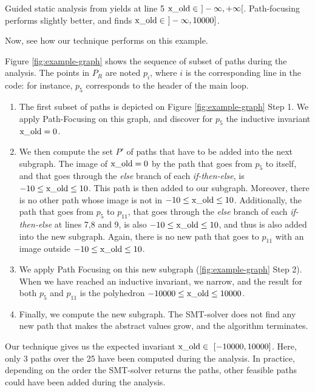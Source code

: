 \documentclass[preprint]{sigplanconf}
\begin{document}
Guided static analysis from \citet{DBLP:conf/sas/GopanR07} yields at line 5
$\lstinline|x_old| \in~]-\infty,+\infty[$.
Path-focusing \citep{Monniaux_Gonnord_SAS11} performs slightly
better, and finds $\lstinline|x_old| \in~]-\infty,10000]$.

Now, see how our technique performs on this example.

Figure \ref{fig:example-graph} shows the sequence of subset of paths during the
analysis. The points in $P_R$ are noted $p_i$, where $i$ is the corresponding
line in the code: for instance, $p_5$ corresponds to the header of the main
loop.

\begin{enumerate}
	\item The first subset of paths is depicted on Figure
		\ref{fig:example-graph} Step 1. We apply Path-Focusing on this graph,
		and discover for $p_5$ the inductive invariant $\lstinline|x_old| = 0$.
	\item
		We then compute the set $P'$ of paths that have to be added into the
		next subgraph. 
		The image of $\lstinline|x_old| = 0$ by the path that goes from $p_5$ to
		itself, and that goes through the \emph{else} branch of each 
		\emph{if-then-else}, is $-10 \leq \lstinline|x_old| \leq 10$. This path
		is then added to our subgraph. Moreover, there is no other path whose
		image is not in $-10 \leq \lstinline|x_old| \leq 10$.
		Additionally, the path that goes from $p_5$ to
		$p_11$, that goes through the \emph{else} branch of each 
		\emph{if-then-else} at lines 7,8 and 9, is also 
		$-10 \leq \lstinline|x_old| \leq 10$, and thus is also added into the
		new subgraph. Again, there is no new path that goes to $p_11$ with an
		image outside $-10 \leq \lstinline|x_old| \leq 10$.
	\item
		We apply Path Focusing on this new subgraph (\ref{fig:example-graph}
		Step 2). When we have reached an inductive invariant, we narrow, and the
		result for both $p_5$ and $p_11$ is the polyhedron 
		$-10000 \leq \lstinline|x_old| \leq 10000$.
	\item Finally, we compute the new subgraph. The SMT-solver does not find any
		new path that makes the abstract values grow, and the algorithm
		terminates.
\end{enumerate}

Our technique gives us the expected invariant 
$\lstinline|x_old| \in~[-10000,\allowbreak 10000]$. 
Here, only 3 paths over the 25 have been computed during the analysis. In
practice, depending on the order the SMT-solver returns the paths, other
feasible paths could have been added during the analysis.
\end{document}
